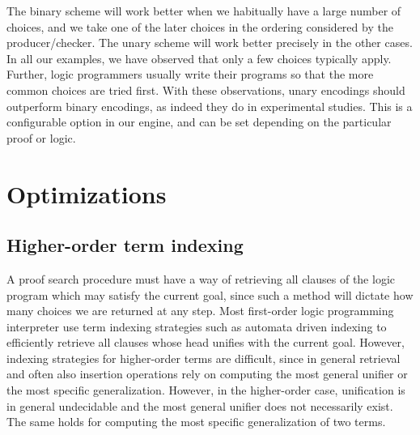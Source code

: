 \documentclass{llncs}
\begin{document}
The binary scheme will work better when we habitually have a large
number of choices, and we take one of the later choices in the
ordering considered by the producer/checker. The unary scheme will
work better precisely in the other cases. In all our examples, we have
observed that only a few choices typically apply. Further, logic
programmers usually write their programs so that the more common
choices are tried first. With these observations, unary encodings
should outperform binary encodings, as indeed they do in experimental
studies. This is a configurable option in our engine, and can be set
depending on the particular proof or logic.

\section{Optimizations}
\subsection{Higher-order term indexing}\label{sec:indexing}

A proof search procedure must have a way of retrieving all clauses of
the logic program which may satisfy the current goal, since such a
method will dictate how many choices we are returned at any step.
Most first-order logic programming interpreter use term indexing
strategies such as automata driven indexing \cite{} to efficiently
retrieve all clauses whose head unifies with the current goal. 
However, indexing strategies for higher-order terms are difficult,
since in general retrieval and often also insertion operations rely on
computing the most general unifier or the most specific
generalization. However, in the higher-order case, unification is in
general undecidable and the most general unifier does not necessarily
exist. The same holds for computing the most specific generalization
of two terms.  
\end{document}
